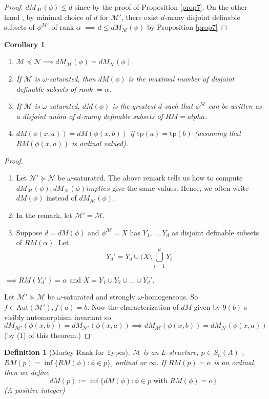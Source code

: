 \documentclass[letterpaper, 12pt]{article}
\newcommand{\cM}{\mathcal{M}}
\newcommand{\cN}{\mathcal{N}}
\newcommand{\Aut}{\mbox{Aut}}
\newcommand{\tp}{\mbox{tp}}
\theoremstyle{stdthm}
\newtheorem{cor}[thm]{Corollary}
\theoremstyle{stddef}
\newtheorem{defn}[thm]{Definition}
\theoremstyle{stdnonum}
\theoremstyle{stdqands}
\theoremstyle{stdbold}
\begin{document}
\begin{proof}
$dM_\cM(\phi) \leq d$ since by the proof of Proposition \ref{prop7}. On the other hand , by minimal choice of $d$ for $\cM'$, there exist $d$-many disjoint definable subsets of $\phi^{\cM'}$ of rank $\alpha$ $\implies d \leq dM_\cM(\phi)$ by Proposition \ref{prop7}
\end{proof}

\begin{cor}
\begin{enumerate}
\item $\cM \preceq \cN \implies dM_\cM(\phi) = dM_\cN(\phi)$. 
\item If $\cM$ is $\omega$-saturated, then $dM(\phi)$ is the maximal number of disjoint definable subsets of rank $= \alpha$. 
\item If $\cM$ is $\omega$-saturated, $dM(\phi)$ is the greatest $d$ such that $\phi^\cM$ can be written as a disjoint union of $d$-many definable subsets of $RM = alpha$. 
\item $dM(\phi(x,a)) = dM(\phi(x,b))$ if $\tp(a) = \tp(b)$ (assuming that $RM(\phi(x,a))$ is ordinal valued). 
\end{enumerate}
\end{cor}

\begin{proof}
\begin{enumerate}
\item Let $\cN'\succeq \cN$ be $\omega$-saturated. The above remark tells us how to compute $dM_\cM(\phi), dM_\cN(\phi) implies$ give the same values. Hence, we often write $dM(\phi)$ instead of $dM_\cM(\phi)$. 
\item In the remark, let $\cM' = \cM$. 
\item Suppose $d = dM(\phi)$ and $\phi^\cM =X$ has $Y_1,\dots, Y_d$ as disjoint definable subsets of $RM(\alpha)$. Let 
\[ Y_d' = Y_d \cup (X \setminus \bigcup_{i=1}^d Y_i \]
\end{enumerate}
$\implies RM(Y_d') = \alpha$ and $X = Y_1 \cup Y_2 \cup \dots \cup Y_d'$. 
\item Let $\cM'\succeq \cM$ be $\omega$-saturated and strongly $\omega$-homogeneous. So $f \in \Aut(\cM') , f(a) = b$. Now the characterization of $dM$ given by $9(b)$ s visibly automorphism invariant so $dM_{\cM'}(\phi(x,b)) = dM_{\cN'}(\phi(x,a)) \implies  dM_\cM(\phi(x,b)) = dM_{\cN}(\phi(x,a))$ (by (1) of this theorem.) 
\end{proof}

\begin{defn}[Morley Rank for Types]
$\cM$ is an $L$-structure, $p \in S_n(A)$ , $RM(p) = \inf\{RM(\phi): \phi \in p\}$, ordinal or $\infty$. If $RM(p)= \alpha$ is an ordinal, then we define 
\[ dM(p) := \inf\{dM(\phi): \phi \in p \mbox{ with } RM(\phi) = \alpha\} \]
(A positive integer)
\end{defn}
\end{document}
